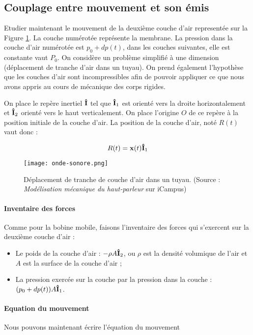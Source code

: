 \subsection{Couplage entre mouvement et son émis}
Etudier maintenant le mouvement de la deuxième couche
d'air representée sur la Figure \ref{wave-sound-scheme}.
La couche numérotée  représente la membrane.
La pression dans la couche d'air numérotée  
est $p_0 + dp(t)$, dans les couches suivantes, elle est
constante vaut $P_0$. On considère un problème simplifié
à une dimension (déplacement de tranche d'air dans un
tuyau). On prend également l'hypothèse que les couches
d'air sont incompressibles afin de pouvoir appliquer
ce que nous avons appris au cours de mécanique des corps
rigides.

On place le repère inertiel ${{\bf\hat{I}}}$ tel que ${\bf\hat{ I}}_1$
est orienté vers la droite horizontalement et ${\bf\hat{ I}}_2$
orienté vers le haut verticalement. On place l'origine
$O$ de ce repère à la position initiale de la couche
d'air. La position de la couche d'air, noté $R(t)$ vaut 
donc :

$$R(t) = {\bf x}(t){\bf\hat{ I}}_1$$

\begin{figure}[ht!]
	\centering
	\texttt{[image: onde-sonore.png]}
	\caption{Déplacement de tranche de couche d'air dans un tuyau. (Source : \textit{Modélisation mécanique du haut-parleur} sur iCampus)}
	\label{wave-sound-scheme}
\end{figure}

\paragraph{Inventaire des forces}
Comme pour la bobine mobile, faisons l'inventaire
des forces qui s'exercent sur la deuxième couche d'air :

\begin{itemize}
	\item Le poids de la couche d'air : $-\rho A{\bf\hat{ I}}_2$, ou $\rho$ est la densité volumique
	de l'air et $A$ est la surface de la couche d'air ;
	\item La pression exercée sur la couche  par la pression dans la couche 
	: $(p_0 + dp(t))A {\bf\hat{ I}}_1$.
\end{itemize}

\paragraph{Equation du mouvement}
Nous pouvons maintenant écrire l'équation du mouvement

